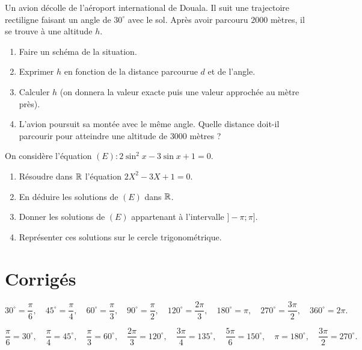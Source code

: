 Un avion décolle de l'aéroport international de Douala. Il suit une trajectoire rectiligne faisant un angle de $30^\circ$ avec le sol. Après avoir parcouru $2000$ mètres, il se trouve à une altitude $h$.
\begin{enumerate}[label=\arabic*)]
\item Faire un schéma de la situation.
\item Exprimer $h$ en fonction de la distance parcourue $d$ et de l'angle.
\item Calculer $h$ (on donnera la valeur exacte puis une valeur approchée au mètre près).
\item L'avion poursuit sa montée avec le même angle. Quelle distance doit-il parcourir pour atteindre une altitude de $3000$ mètres ?
\end{enumerate}

On considère l'équation $(E) : 2\sin^2 x - 3\sin x + 1 = 0$.
\begin{enumerate}[label=\arabic*)]
\item Résoudre dans $\mathbb{R}$ l'équation $2X^2 - 3X + 1 = 0$.
\item En déduire les solutions de $(E)$ dans $\mathbb{R}$.
\item Donner les solutions de $(E)$ appartenant à l'intervalle $]-\pi;\pi]$.
\item Représenter ces solutions sur le cercle trigonométrique.
\end{enumerate}

\section{Corrigés}

\[
30^\circ = \frac{\pi}{6},\quad 45^\circ = \frac{\pi}{4},\quad 60^\circ = \frac{\pi}{3},\quad 90^\circ = \frac{\pi}{2},\quad 120^\circ = \frac{2\pi}{3},\quad 180^\circ = \pi,\quad 270^\circ = \frac{3\pi}{2},\quad 360^\circ = 2\pi.
\]

\[
\frac{\pi}{6}=30^\circ,\quad \frac{\pi}{4}=45^\circ,\quad \frac{\pi}{3}=60^\circ,\quad \frac{2\pi}{3}=120^\circ,\quad \frac{3\pi}{4}=135^\circ,\quad \frac{5\pi}{6}=150^\circ,\quad \pi=180^\circ,\quad \frac{3\pi}{2}=270^\circ.
\]

\begin{center}
\begin{illus}
\end{illus}
\end{center}

